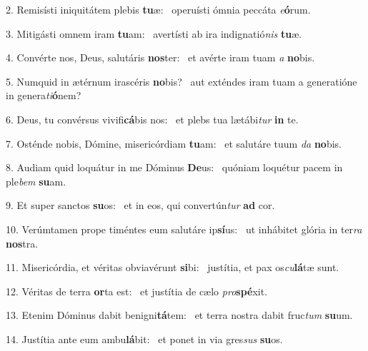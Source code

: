 2. Remisísti iniquitátem plebis \textbf{tu}æ: \ast\  operuísti ómnia peccáta \textit{e}\textbf{ó}rum.\

3. Mitigásti omnem iram \textbf{tu}am: \ast\  avertísti ab ira indignatió\textit{nis} \textbf{tu}æ.\

4. Convérte nos, Deus, salutáris \textbf{nos}ter: \ast\  et avérte iram tuam \textit{a} \textbf{no}bis.\

5. Numquid in ætérnum irascéris \textbf{no}bis? \ast\  aut exténdes iram tuam a generatióne in genera\textit{ti}\textbf{ó}nem?\

6. Deus, tu convérsus vivifi\textbf{cá}bis nos: \ast\  et plebs tua lætábi\textit{tur} \textbf{in} te.\

7. Osténde nobis, Dómine, misericórdiam \textbf{tu}am: \ast\  et salutáre tuum \textit{da} \textbf{no}bis.\

8. Audiam quid loquátur in me Dóminus \textbf{De}us: \ast\  quóniam loquétur pacem in ple\textit{bem} \textbf{su}am.\

9. Et super sanctos \textbf{su}os: \ast\  et in eos, qui convertún\textit{tur} \textbf{ad} cor.\

10. Verúmtamen prope timéntes eum salutáre ip\textbf{sí}us: \ast\  ut inhábitet glória in ter\textit{ra} \textbf{nos}tra.\

11. Misericórdia, et véritas obviavérunt \textbf{si}bi: \ast\  justítia, et pax os\textit{cu}\textbf{lá}tæ sunt.\

12. Véritas de terra \textbf{or}ta est: \ast\  et justítia de cælo \textit{pro}\textbf{spé}xit.\

13. Etenim Dóminus dabit benigni\textbf{tá}tem: \ast\  et terra nostra dabit fruc\textit{tum} \textbf{su}um.\

14. Justítia ante eum ambu\textbf{lá}bit: \ast\  et ponet in via gres\textit{sus} \textbf{su}os.\

